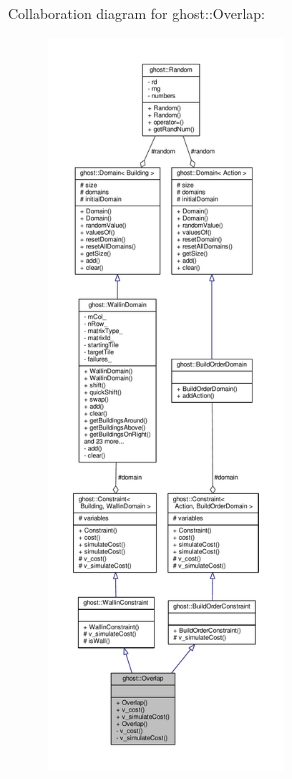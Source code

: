 Collaboration diagram for ghost\-:\-:Overlap\-:
\nopagebreak
\begin{figure}[H]
\begin{center}
\leavevmode
\includegraphics[height=550pt]{classghost_1_1Overlap__coll__graph}
\end{center}
\end{figure}
